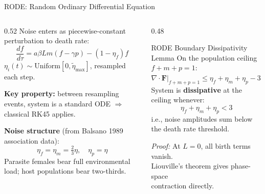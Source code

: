 \documentclass{beamer}
\begin{document}
\begin{frame}{RODE: Random Ordinary Differential Equation}

    \footnotesize

    \begin{columns}[T]
    \begin{column}{0.52\textwidth}
      Noise enters as piecewise-constant perturbation to death rate:
      \[
        \frac{df}{d\tau} = a\beta L m(f-\gamma p) - (1-\eta_f)f
      \]
      $\eta_i(t) \sim \mathrm{Uniform}[0, \tilde{\eta}_{\max}]$,
      resampled each step.

      \vspace{0.2cm}
      \textbf{Key property:} between resampling events, system is a
      standard ODE $\Rightarrow$ classical RK45 applies.

      \vspace{0.3cm}
      \textbf{Noise structure} (from Balsano 1989 association data):
      \[
        \eta_f = \eta_m = \tfrac{2}{3}\eta, \quad \eta_p = \eta
      \]
      Parasite females bear full environmental load; host populations
      bear two-thirds.
    \end{column}

    \begin{column}{0.48\textwidth}
      \begin{block}{RODE Boundary Dissipativity Lemma}
        On the population ceiling $f+m+p=1$:\\[4pt]
        $\nabla\cdot\mathbf{F}\big|_{f+m+p=1}
          \leq \eta_f + \eta_m + \eta_p - 3$\\[6pt]
        System is \textbf{dissipative} at the ceiling whenever:
        \[
          \eta_f + \eta_m + \eta_p < 3
        \]
        i.e., noise amplitudes sum below the death rate threshold.
      \end{block}

      \vspace{0.2cm}
      \textit{Proof:} At $L=0$, all birth terms vanish.\\
      Liouville's theorem gives phase-space\\
      contraction directly.
    \end{column}
  \end{columns}

\end{frame}
\end{document}
